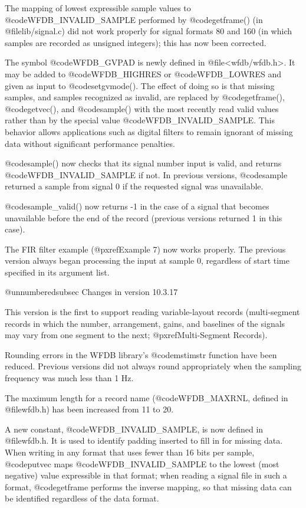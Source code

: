 The mapping of lowest expressible sample values to @code{WFDB_INVALID_SAMPLE}
performed by @code{getframe()} (in @file{lib/signal.c}) did not work properly
for signal formats 80 and 160 (in which samples are recorded as unsigned
integers); this has now been corrected.

The symbol @code{WFDB_GVPAD} is newly defined in @file{<wfdb/wfdb.h>}.
It may be added to @code{WFDB_HIGHRES} or @code{WFDB_LOWRES} and given
as input to @code{setgvmode()}.
The effect of doing so is that missing samples, and samples recognized
as invalid, are replaced by @code{getframe()}, @code{getvec()}, and
@code{sample()} with the most recently read valid values rather than by
the special value @code{WFDB_INVALID_SAMPLE}.
This behavior allows applications such as digital filters to remain
ignorant of missing data without significant performance penalties.

@code{sample()} now checks that its signal number input
is valid, and returns @code{WFDB_INVALID_SAMPLE} if not.  In previous
versions, @code{sample} returned a sample from signal 0 if the requested
signal was unavailable.

@code{sample_valid()} now returns -1 in the case of a signal that becomes
unavailable before the end of the record (previous versions returned 1 in this case).

The FIR filter example (@pxref{Example 7}) now works properly.  The
previous version always began processing the input at sample 0,
regardless of start time specified in its argument list.

@unnumberedsubsec Changes in version 10.3.17

This version is the first to support reading variable-layout records
(multi-segment records in which the number, arrangement, gains, and baselines
of the signals may vary from one segment to the next; @pxref{Multi-Segment
Records}).

Rounding errors in the WFDB library's @code{mstimstr} function have been
reduced.  Previous versions did not always round appropriately when the
sampling frequency was much less than 1 Hz.

The maximum length for a record name (@code{WFDB_MAXRNL}, defined in
@file{wfdb.h}) has been increased from 11 to 20.

A new constant, @code{WFDB_INVALID_SAMPLE}, is now defined in @file{wfdb.h}.
It is used to identify padding inserted to fill in for missing data.  When
writing in any format that uses fewer than 16 bits per sample, @code{putvec}
maps @code{WFDB_INVALID_SAMPLE} to the lowest (most negative) value expressible
in that format; when reading a signal file in such a format, @code{getframe}
performs the inverse mapping, so that missing data can be identified regardless
of the data format.

